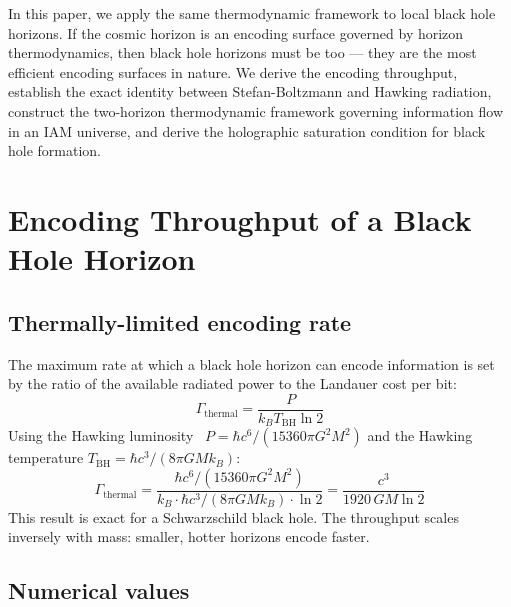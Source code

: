 \documentclass[12pt,a4paper]{article}
\begin{document}
In this paper, we apply the same thermodynamic framework to local black hole
horizons. If the cosmic horizon is an encoding surface governed by horizon
thermodynamics, then black hole horizons must be too --- they are the most
efficient encoding surfaces in nature. We derive the encoding throughput,
establish the exact identity between Stefan-Boltzmann and Hawking radiation,
construct the two-horizon thermodynamic framework governing information flow
in an IAM universe, and derive the holographic saturation condition for black
hole formation.

\section{Encoding Throughput of a Black Hole Horizon}

\subsection{Thermally-limited encoding rate}

The maximum rate at which a black hole horizon can encode information is set by
the ratio of the available radiated power to the Landauer cost per bit:
\begin{equation}
\Gamma_\mathrm{thermal} = \frac{P}{k_B T_\mathrm{BH} \ln 2}
\end{equation}
Using the Hawking luminosity~\citep{Hawking1975}
$P = \hbar c^6/(15360\pi G^2 M^2)$ and the Hawking temperature
$T_\mathrm{BH} = \hbar c^3/(8\pi G M k_B)$:
\begin{equation}
\Gamma_\mathrm{thermal}
= \frac{\hbar c^6/(15360\pi G^2 M^2)}{k_B \cdot \hbar c^3/(8\pi G M k_B) \cdot \ln 2}
= \frac{c^3}{1920\, G M \ln 2}
\label{eq:gamma}
\end{equation}
This result is exact for a Schwarzschild black hole. The throughput scales
inversely with mass: smaller, hotter horizons encode faster.

\subsection{Numerical values}
\end{document}
